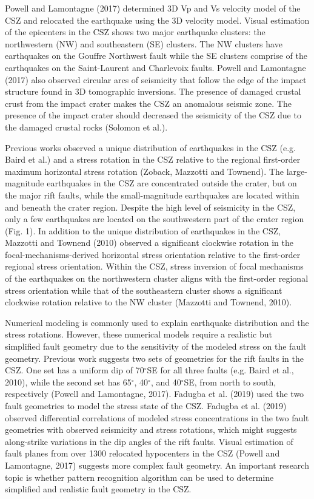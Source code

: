 \documentclass[draft]{agujournal2018}
\begin{document}
Powell and Lamontagne (2017) determined 3D Vp and Vs velocity model of the CSZ and relocated the earthquake using the 3D velocity model. Visual estimation of the epicenters in the CSZ shows two major earthquake clusters: the northwestern (NW) and southeastern (SE) clusters. The NW clusters have earthquakes on the Gouffre Northwest fault while the SE clusters comprise of the earthquakes on the Saint-Laurent and Charlevoix faults. Powell and Lamontagne (2017) also observed circular arcs of seismicity that follow the edge of the impact structure found in 3D tomographic inversions. The presence of damaged crustal crust from the impact crater makes the CSZ an anomalous seismic zone. The presence of the impact crater should decreased the seismicity of the CSZ due to the damaged crustal rocks (Solomon et al.).

Previous works observed a unique distribution of earthquakes in the CSZ (e.g. Baird et al.) and a stress rotation in the CSZ relative to the regional first-order maximum horizontal stress rotation (Zoback, Mazzotti and Townend). The large-magnitude earthquakes in the CSZ are concentrated outside the crater, but on the major rift faults, while the small-magnitude earthquakes are located within and beneath the crater region. Despite the high level of seismicity in the CSZ, only a few earthquakes are located on the southwestern part of the crater region (Fig. 1). In addition to the unique distribution of earthquakes in the CSZ, Mazzotti and Townend (2010) observed a significant clockwise rotation in the focal-mechanisms-derived horizontal stress orientation relative to the first-order regional stress orientation. Within the CSZ, stress inversion of focal mechanisms of the earthquakes on the northwestern cluster aligns with the first-order regional stress orientation while that of the southeastern cluster shows a significant clockwise rotation relative to the NW cluster (Mazzotti and Townend, 2010).

Numerical modeling is commonly used to explain earthquake distribution and the stress rotations. However, these numerical models require a realistic but simplified fault geometry due to the sensitivity of the modeled stress on the fault geometry. Previous work suggests two sets of geometries for the rift faults in the CSZ. One set has a uniform dip of 70$^\circ$SE for all three faults (e.g. Baird et al., 2010), while the second set has 65$^\circ$, 40$^\circ$, and 40$^\circ$SE, from north to south, respectively (Powell and Lamontagne, 2017). Fadugba et al. (2019) used the two fault geometries to model the stress state of the CSZ. Fadugba et al. (2019) observed differential correlations of modeled stress concentrations in the two fault geometries with observed seismicity and stress rotations, which might suggests along-strike variations in the dip angles of the rift faults. Visual estimation of fault planes from over 1300 relocated hypocenters in the CSZ (Powell and Lamontagne, 2017) suggests more complex fault geometry. An important research topic is whether pattern recognition algorithm can be used to determine simplified and realistic fault geometry in the CSZ.
\end{document}
